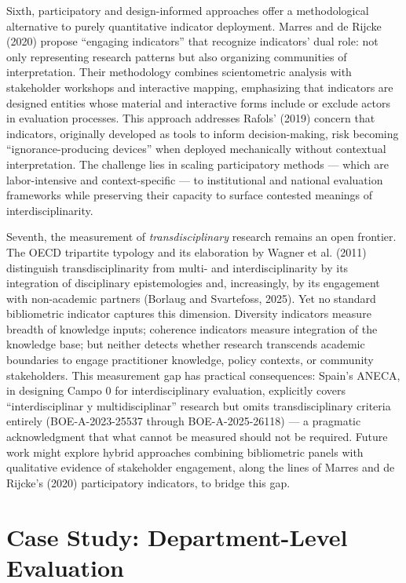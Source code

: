\documentclass[
]{article}
\begin{document}
Sixth, participatory and design-informed approaches offer a
methodological alternative to purely quantitative indicator deployment.
Marres and de Rijcke (2020) propose ``engaging indicators'' that
recognize indicators' dual role: not only representing research patterns
but also organizing communities of interpretation. Their methodology
combines scientometric analysis with stakeholder workshops and
interactive mapping, emphasizing that indicators are designed entities
whose material and interactive forms include or exclude actors in
evaluation processes. This approach addresses Rafols' (2019) concern
that indicators, originally developed as tools to inform
decision-making, risk becoming ``ignorance-producing devices'' when
deployed mechanically without contextual interpretation. The challenge
lies in scaling participatory methods --- which are labor-intensive and
context-specific --- to institutional and national evaluation frameworks
while preserving their capacity to surface contested meanings of
interdisciplinarity.

Seventh, the measurement of \emph{transdisciplinary} research remains an
open frontier. The OECD tripartite typology and its elaboration by
Wagner et al. (2011) distinguish transdisciplinarity from multi- and
interdisciplinarity by its integration of disciplinary epistemologies
and, increasingly, by its engagement with non-academic partners (Borlaug
and Svartefoss, 2025). Yet no standard bibliometric indicator captures
this dimension. Diversity indicators measure breadth of knowledge
inputs; coherence indicators measure integration of the knowledge base;
but neither detects whether research transcends academic boundaries to
engage practitioner knowledge, policy contexts, or community
stakeholders. This measurement gap has practical consequences: Spain's
ANECA, in designing Campo 0 for interdisciplinary evaluation, explicitly
covers ``interdisciplinar y multidisciplinar'' research but omits
transdisciplinary criteria entirely (BOE-A-2023-25537 through
BOE-A-2025-26118) --- a pragmatic acknowledgment that what cannot be
measured should not be required. Future work might explore hybrid
approaches combining bibliometric panels with qualitative evidence of
stakeholder engagement, along the lines of Marres and de Rijcke's (2020)
participatory indicators, to bridge this gap.

\hypertarget{case-study-department-level-evaluation}{%
\section{Case Study: Department-Level
Evaluation}\label{case-study-department-level-evaluation}}
\end{document}

